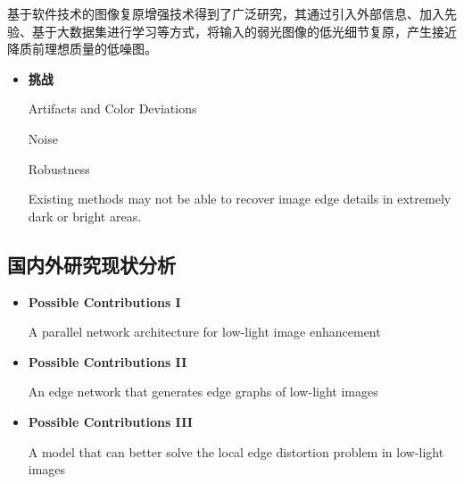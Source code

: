 \documentclass[CJK,aspectratio=169]{beamer}  %
\begin{document}
	\begin{frame}
		
		{ \yahei 基于软件技术的图像复原增强技术得到了广泛研究，其通过引入外部信息、加入先验、基于大数据集进行学习等方式，将输入的弱光图像的低光细节复原，产生接近降质前理想质量的低噪图。}

		\begin{itemize} 
			\item \textbf{挑战}
				
			Artifacts and Color Deviations 
				
			Noise
				
			Robustness
			
			Existing methods may not be able to recover image edge details in extremely dark or bright areas.
			
				
		\end{itemize}
	\end{frame}
	
	\subsection{国内外研究现状分析}
	
	\begin{frame}
		
		\begin{itemize} 
			\item \textbf{Possible Contributions I}
			
			A parallel network architecture for low-light image enhancement
			
			\item \textbf{Possible Contributions II}
			
			An edge network that generates edge graphs of low-light images
			
			\item \textbf{Possible Contributions III}
			
			A model that can better solve the local edge distortion problem in low-light images
		\end{itemize}

	\end{frame}
	
\end{document}
